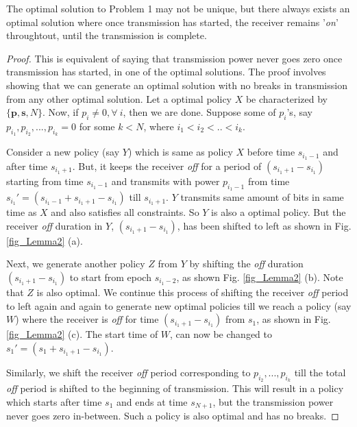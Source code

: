 \begin{lemma}
The optimal solution to Problem 1 may not be unique, but there always exists an optimal solution where once transmission has started, the receiver remains '\textit{on}' throughtout, until the transmission is complete. \label{lemma_nobreaks}
\end{lemma}
\begin{proof}
This is equivalent of saying that transmission power never goes zero once transmission has started, in one of the optimal solutions. The proof involves showing that we can generate an optimal solution with no breaks in transmission from any other optimal solution. Let a optimal policy $X$ be characterized by $\{\bm{p},\bm{s},N\}$. Now, if $p_i\neq 0,\forall \ i$, then we are done. Suppose some of $p_i$'s, say $p_{i_1},p_{i_2},...,p_{i_k}=0$ for some $k<N$, where $i_1<i_2<..<i_k$. 

Consider a new policy (say $Y$) which is same as policy $X$ before time $s_{i_1-1}$ and after time $s_{i_1+1}$. But, it keeps the receiver \textit{off} for a period of $(s_{i_1+1}-s_{i_1})$ starting from time $s_{i_1-1}$ and transmits with power $p_{i_1-1}$ from time $s_{i_1}'=(s_{i_1-1}+s_{i_1+1}-s_{i_1})$ till $s_{i_1+1}$. $Y$ transmits same amount of bits in same time as $X$ and also satisfies all constraints. So $Y$ is also a optimal policy. But the receiver \textit{off} duration in $Y$, $(s_{{i_1+1}}-s_{i_1})$, has been shifted to left as shown in Fig.\ref{fig_Lemma2} (a). 

Next, we generate another policy $Z$ from $Y$ by shifting the \textit{off} duration $(s_{{i_1+1}}-s_{i_1})$ to start from epoch $s_{i_1-2}$, as shown Fig. \ref{fig_Lemma2} (b). Note that $Z$ is also optimal. We continue this process of shifting the receiver \textit{off} period to left again and again to generate new optimal policies till we reach a policy (say $W$) where the receiver is \textit{off} for time $(s_{{i_1+1}}-s_{i_1})$ from $s_1$, as shown in Fig. \ref{fig_Lemma2} (c). The start time of $W$, can now be changed to $s_1'=(s_1+s_{i_1+1}-s_{i_1})$. 

Similarly, we shift the receiver \textit{off} period corresponding to $p_{i_2},...,p_{i_k}$ till the total \textit{off} period is shifted to the beginning of transmission. This will result in a policy which starts after time $s_1$ and ends at time $s_{N+1}$, but the transmission power never goes zero in-between. Such a policy is also optimal and has no breaks.
\end{proof}
